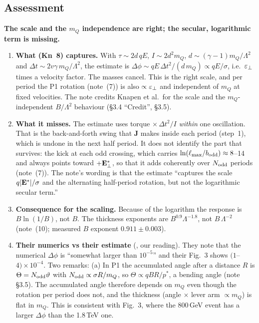 \documentclass[11pt]{article}
\newcommand{\vhead}[1]{\noindent\textbf{\textsf{#1}}\par\smallskip}
\begin{document}
\subsection{Assessment}
\begin{verdict}
\vhead{The scale and the $m_Q$ independence are right; the secular, logarithmic term is missing.}
\begin{enumerate}[leftmargin=*]
\item \textbf{What (Kn~8) captures.} With $\tau\sim2d\,qE$, $I\sim2d^2m_Q$, $d\sim(\gamma-1)m_Q/\Lambda^2$ and
  $\Delta t\sim2v\gamma\,m_Q/\Lambda^2$, the estimate is $\Delta\phi\sim qE\,\Delta t^2/(d\,m_Q)\propto qE/\sigma$, i.e.\
  $\varepsilon_\perp$ times a velocity factor. The masses cancel. This is the right scale, and per period the P1 rotation (note~(7)) is
  also $\propto\varepsilon_\perp$ and independent of $m_Q$ at fixed velocities. The note credits Knapen et al.\ for the scale and
  the $m_Q$-independent $B/\Lambda^2$ behaviour (\S3.4 ``Credit'', \S3.5).
\item \textbf{What it misses.} The estimate uses torque $\times\,\Delta t^2/I$ \emph{within} one oscillation. That is the
  back-and-forth swing that $\mathbf J$ makes inside each period (step~1), which is undone in the next half period. It
  does not identify the part that survives: the kick at each odd crossing, which carries $\ln(\ell_{\max}/b_{\rm odd})\approx8$--14
  and always points toward $+\mathbf{E}^*_\perp$, so that it adds coherently over $N_{\rm odd}$ periods (note~(7)). The note's
  wording is that the estimate ``captures the scale $q|\mathbf{E}^*|/\sigma$ and the alternating half-period rotation, but not
  the logarithmic secular term.''
\item \textbf{Consequence for the scaling.} Because of the logarithm the response is $B\ln(1/B)$, not $B$. The
  thickness exponents are $B^{0.9}\Lambda^{-1.8}$, not $B\,\Lambda^{-2}$ (note~(10); measured $B$ exponent
  $0.911\pm0.003$).
\item \textbf{Their numerics vs their estimate} (\EST{}, our reading). They note that the numerical $\Delta\phi$ is
  ``somewhat larger than $10^{-5}$'' and their Fig.~3 shows $(1$--$4)\times10^{-4}$. Two remarks:
  (a) In P1 the accumulated angle after a distance $R$ is $\Theta=N_{\rm odd}\vartheta$ with $N_{\rm odd}\propto\sigma R/m_Q$,
  so $\Theta\propto qBR/p^*$, a bending angle (note \S3.5). The accumulated angle therefore depends on $m_Q$ even though the
  rotation per period does not, and the thickness (angle $\times$ lever arm $\propto m_Q$) is flat in $m_Q$. This is
  consistent with Fig.~3, where the 800\,GeV event has a larger $\Delta\phi$ than the 1.8\,TeV one.

\end{enumerate}
\end{verdict}
\end{document}
